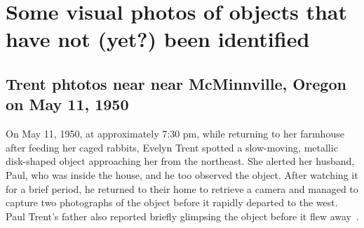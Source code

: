 %
%
%
\chapter{Some visual photos of objects that have not (yet?) been identified}
\label{2023-UFO-part-History-photos} %







\newpage


\section{Trent phtotos near near McMinnville, Oregon on May 11, 1950}
\label{2023-UFO-part-History-photos-1950-tr}

On May 11, 1950, at approximately 7:30 pm, while returning to her farmhouse after feeding her caged rabbits,
Evelyn Trent spotted a slow-moving, metallic disk-shaped object approaching her from the northeast.
She alerted her husband, Paul, who was inside the house, and he too observed the object.
After watching it for a brief period, he returned to their home to retrieve a camera and managed
to capture two photographs of the object before it rapidly departed to the west.
Paul Trent's father also reported briefly glimpsing the object before it flew away~\cite[Case~46]{Condon-report-Bantam}.


